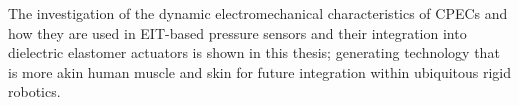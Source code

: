 The investigation of the dynamic electromechanical characteristics of CPECs and how they are used in EIT-based pressure sensors and their integration into dielectric elastomer actuators is shown in this thesis; generating technology that is more akin human muscle and skin for future integration within ubiquitous rigid robotics.



\cleardoublepage